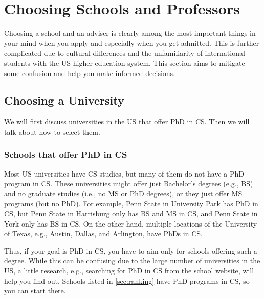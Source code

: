 \documentclass[oneside,11pt,dvipsnames]{book}
\begin{document}
\chapter{Choosing Schools and Professors}\label{sec:schoolsandprofs}

Choosing a school and an adviser is clearly among the most important things in your mind when you apply and especially when you get admitted.  This is further complicated due to cultural differences and the unfamiliarity of international students with the US higher education system.  This section aims to mitigate some confusion and help you make informed decisions.

\section{Choosing a University}\label{sec:choosing-university}

We will first discuss universities in the US that offer PhD in CS. Then we will talk about how to select them.

\subsection{Schools that offer PhD in CS}

Most US universities have CS studies, but many of them do not have a PhD program in CS. These universities might offer just Bachelor's degrees (e.g., BS) and no graduate studies (i.e., no MS or PhD degrees), or they just offer MS programs (but no PhD). For example, Penn State in University Park has PhD in CS,  but Penn State in Harrisburg only has BS and MS in CS, and Penn State in York only has BS in CS.  On the other hand, multiple locations of the University of Texas, e.g., Austin, Dallas, and Arlington, have PhDs in CS.

Thus, if your goal is PhD in CS, you have to aim only for schools offering such a degree.  %
While this can be confusing due to the large number of universities in the US, a little research, e.g., searching for PhD in CS from the school website, will help you find out. Schools listed in \autoref{sec:ranking} have PhD programs in CS, so you can start there.

\end{document}

